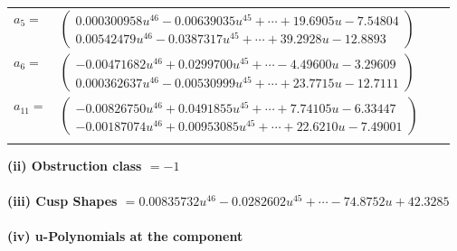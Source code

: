 \documentclass[1p]{elsarticle_modified}
\theoremstyle{definition}
\begin{document}
\begin{tabular}{m{7pt} m{180pt} m{7pt} m{180pt} }
\flushright $a_{5}=$&$\begin{pmatrix}0.000300958 u^{46}-0.00639035 u^{45}+\cdots+19.6905 u-7.54804\\0.00542479 u^{46}-0.0387317 u^{45}+\cdots+39.2928 u-12.8893\end{pmatrix}$ \\
\flushright $a_{6}=$&$\begin{pmatrix}-0.00471682 u^{46}+0.0299700 u^{45}+\cdots-4.49600 u-3.29609\\0.000362637 u^{46}-0.00530999 u^{45}+\cdots+23.7715 u-12.7111\end{pmatrix}$ \\
\flushright $a_{11}=$&$\begin{pmatrix}-0.00826750 u^{46}+0.0491855 u^{45}+\cdots+7.74105 u-6.33447\\-0.00187074 u^{46}+0.00953085 u^{45}+\cdots+22.6210 u-7.49001\end{pmatrix}$\\&\end{tabular}
\flushleft \textbf{(ii) Obstruction class $= -1$}\\~\\
\flushleft \textbf{(iii) Cusp Shapes $= 0.00835732 u^{46}-0.0282602 u^{45}+\cdots-74.8752 u+42.3285$}\\~\\
\newpage\renewcommand{\arraystretch}{1}
\flushleft \textbf{(iv) u-Polynomials at the component}\newline \\
\end{document}
